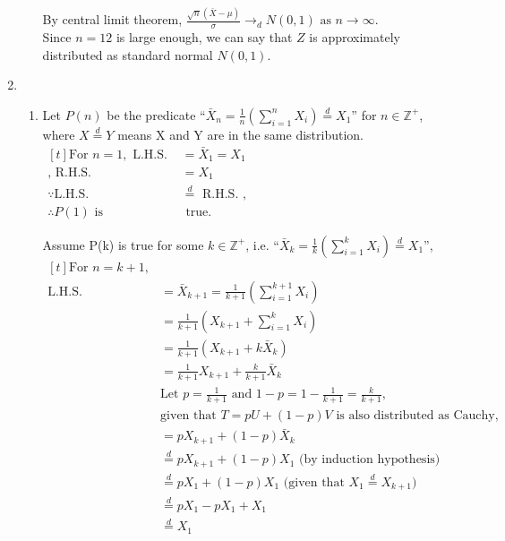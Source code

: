 \documentclass{article}
\begin{document}
\begin{enumerate}
\begin{enumerate}[label=(\roman*)]
    By central limit theorem,
    $\frac{\sqrt{n}(\bar{X} - \mu)}{\sigma} \to_d N(0, 1) \text{ as } n \to \infty.$ \\
    Since $n = 12$ is  large enough, we can say that $Z$ is approximately distributed as standard normal $N(0, 1)$.
    \end{enumerate}

\item 
    \begin{enumerate}[label=(\roman*)]
    \item 
    Let $P(n)$ be the predicate ``$\bar{X}_n = \frac{1}{n} (\sum_{i=1}^{n} X_i) \overset{d}{=} X_1 $'' for $n \in \mathbb{Z}^+$, where $X \overset{d}{=} Y$ means X and Y are in the same distribution. \\
    $\begin{aligned}[t]
    \text{For } n = 1, \text{ L.H.S. } &=  \bar{X}_1 = X_1 \\
    \text{, R.H.S. } &= X_1 \\
    \because \text{L.H.S. } & \overset{d}{=} \text{ R.H.S. }, \\
    \therefore P(1) \text{ is} & \text{ true.}
    \end{aligned}$

    Assume P(k) is true for some $k \in \mathbb{Z}^+$, i.e. ``$\bar{X}_k = \frac{1}{k} (\sum_{i=1}^{k} X_i) \overset{d}{=} X_1 $'', \\
    $\begin{aligned}[t]
    \text{For } n = k + 1, \\
    \text{L.H.S. } &= \bar{X}_{k+1} = \frac{1}{k+1} (\sum_{i=1}^{k+1} X_i) \\
    &= \frac{1}{k+1} (X_{k+1} + \sum_{i=1}^{k} X_i) \\
    &= \frac{1}{k+1} (X_{k+1} + k \bar{X}_k) \\
    &= \frac{1}{k+1} X_{k+1} + \frac{k}{k+1} \bar{X}_k \\
    & \text{Let } p = \frac{1}{k+1} \text{ and } 1-p = 1 - \frac{1}{k+1} = \frac{k}{k+1}, \\
    & \text{given that } T = pU+(1-p)V \text{ is also distributed as Cauchy,} \\
    &= p X_{k+1} + (1-p) \bar{X}_k \\
    & \overset{d}{=} p X_{k+1} + (1-p) X_1  \text{    (by induction hypothesis)} \\
    & \overset{d}{=} p X_{1} + (1-p) X_1 \text{ (given that } X_1 \overset{d}{=} X_{k+1}) \\
    & \overset{d}{=} p X_{1} - p X_{1} + X_1 \\
    & \overset{d}{=} X_1 \\
    \end{aligned}$


\end{enumerate}
\end{enumerate}
\end{document}

